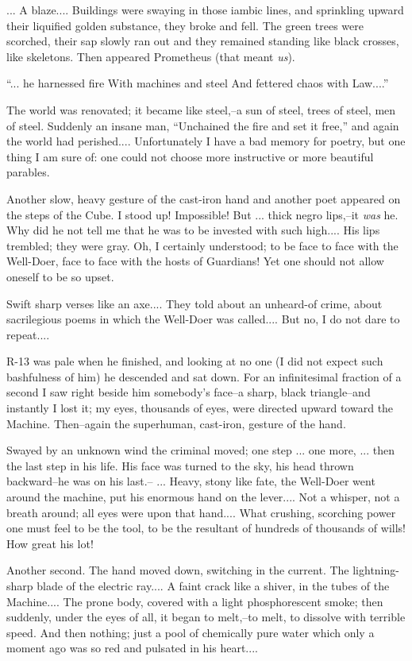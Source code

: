 \documentclass[11pt,openany]{book}
\begin{document}
... A blaze.... Buildings were swaying in those iambic lines, and sprinkling upward their liquified golden substance, they broke and fell. The green trees were scorched, their sap slowly ran out and they remained standing like black crosses, like skeletons. Then appeared Prometheus (that meant \emph{us}).

``... he harnessed fire With machines and steel And fettered chaos with Law....''

The world was renovated; it became like steel,--a sun of steel, trees of steel, men of steel. Suddenly an insane man, ``Unchained the fire and set it free,'' and again the world had perished.... Unfortunately I have a bad memory for poetry, but one thing I am sure of: one could not choose more instructive or more beautiful parables.

Another slow, heavy gesture of the cast-iron hand and another poet appeared on the steps of the Cube. I stood up! Impossible! But ... thick negro lips,--it \emph{was} he. Why did he not tell me that he was to be invested with such high.... His lips trembled; they were gray. Oh, I certainly understood; to be face to face with the Well-Doer, face to face with the hosts of Guardians! Yet one should not allow oneself to be so upset.

Swift sharp verses like an axe.... They told about an unheard-of crime, about sacrilegious poems in which the Well-Doer was called.... But no, I do not dare to repeat....

R-13 was pale when he finished, and looking at no one (I did not expect such bashfulness of him) he descended and sat down. For an infinitesimal fraction of a second I saw right beside him somebody's face--a sharp, black triangle--and instantly I lost it; my eyes, thousands of eyes, were directed upward toward the Machine. Then--again the superhuman, cast-iron, gesture of the hand.

Swayed by an unknown wind the criminal moved; one step ... one more, ... then the last step in his life. His face was turned to the sky, his head thrown backward--he was on his last.-- ... Heavy, stony like fate, the Well-Doer went around the machine, put his enormous hand on the lever.... Not a whisper, not a breath around; all eyes were upon that hand.... What crushing, scorching power one must feel to be the tool, to be the resultant of hundreds of thousands of wills! How great his lot!

Another second. The hand moved down, switching in the current. The lightning-sharp blade of the electric ray.... A faint crack like a shiver, in the tubes of the Machine.... The prone body, covered with a light phosphorescent smoke; then suddenly, under the eyes of all, it began to melt,--to melt, to dissolve with terrible speed. And then nothing; just a pool of chemically pure water which only a moment ago was so red and pulsated in his heart....
\end{document}
